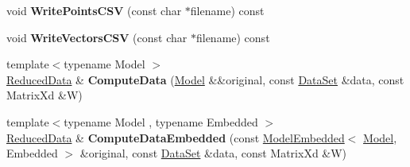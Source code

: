 \begin{DoxyCompactItemize}
\item 
\hypertarget{struct_d_r_d_s_p_1_1_reduced_data_a79e492ae200fb5da34340f410e158354}{void {\bfseries Write\-Points\-C\-S\-V} (const char $\ast$filename) const }\label{struct_d_r_d_s_p_1_1_reduced_data_a79e492ae200fb5da34340f410e158354}

\item 
\hypertarget{struct_d_r_d_s_p_1_1_reduced_data_a972703812e0d0194e5287966a74df79f}{void {\bfseries Write\-Vectors\-C\-S\-V} (const char $\ast$filename) const }\label{struct_d_r_d_s_p_1_1_reduced_data_a972703812e0d0194e5287966a74df79f}

\item 
\hypertarget{struct_d_r_d_s_p_1_1_reduced_data_a1444567077495f5d80ed3c440134dfe7}{{\footnotesize template$<$typename Model $>$ }\\\hyperlink{struct_d_r_d_s_p_1_1_reduced_data}{Reduced\-Data} \& {\bfseries Compute\-Data} (\hyperlink{struct_d_r_d_s_p_1_1_model}{Model} \&\&original, const \hyperlink{struct_d_r_d_s_p_1_1_data_set}{Data\-Set} \&data, const Matrix\-Xd \&W)}\label{struct_d_r_d_s_p_1_1_reduced_data_a1444567077495f5d80ed3c440134dfe7}

\item 
\hypertarget{struct_d_r_d_s_p_1_1_reduced_data_a1bd28c977de1294d9303687080eb4df8}{{\footnotesize template$<$typename Model , typename Embedded $>$ }\\\hyperlink{struct_d_r_d_s_p_1_1_reduced_data}{Reduced\-Data} \& {\bfseries Compute\-Data\-Embedded} (const \hyperlink{struct_d_r_d_s_p_1_1_model_embedded}{Model\-Embedded}$<$ \hyperlink{struct_d_r_d_s_p_1_1_model}{Model}, Embedded $>$ \&original, const \hyperlink{struct_d_r_d_s_p_1_1_data_set}{Data\-Set} \&data, const Matrix\-Xd \&W)}\label{struct_d_r_d_s_p_1_1_reduced_data_a1bd28c977de1294d9303687080eb4df8}

\end{DoxyCompactItemize}
